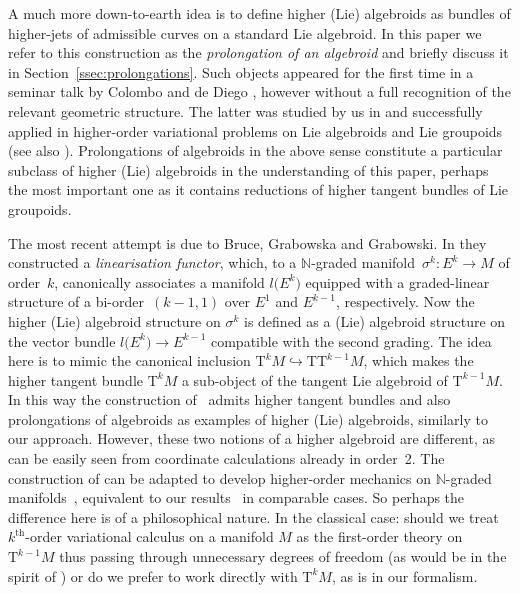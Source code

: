\documentclass[10pt,a4paper]{amsart}
\newcommand{\grB}{{$\N$-graded manifold}}
\newcommand{\grBs}{{$\N$-graded manifolds}}
\newcommand{\degree}{{order}}
\newcommand{\thh}[1]{#1^{\mathrm{th}}} %
\newcommand{\N}{\mathbb{N}}
\newcommand{\ra}{\rightarrow}
\newcommand{\T}{\mathrm{T}} %
\newcommand{\TT}[1]{\mathrm{T}^{#1}} %
\numberwithin{equation}{section}
\theoremstyle{definition}
\begin{document}
A much more down-to-earth idea is to define higher (Lie) algebroids as bundles of higher-jets of admissible curves on a standard Lie algebroid. In this paper we refer to this construction as the \emph{prolongation of an algebroid} and briefly discuss it in Section~\ref{ssec:prolongations}. Such objects appeared for the first time in a seminar talk by Colombo and de Diego \cite{Col_deDiego_seminar_2011}, however without a full recognition of the relevant geometric structure. The latter was studied by us in \cite{MJ_MR_models_high_alg_2015} and successfully applied in higher-order variational problems on Lie algebroids and Lie groupoids \cite{MJ_MR_prototypes} (see also \cite{Martinez_2015}). Prolongations of algebroids in the above sense constitute a particular subclass of higher (Lie) algebroids in the understanding of this paper, perhaps the most important one as it contains reductions of higher tangent bundles of Lie groupoids.

The most recent attempt is due to Bruce, Grabowska and Grabowski. In \cite{Bruce_Grabowska_Grabowski_2016} they constructed a \emph{linearisation functor}, which, to a \grB\ $\sigma^k\colon E^k\ra M$ of \degree\ $k$, canonically associates a manifold $l\big(E^k\big)$ equipped with a graded-linear structure of a bi-\degree\ $(k-1,1)$ over $E^1$ and $E^{k-1}$, respectively. Now the higher (Lie) algebroid structure on $\sigma^k$ is defined as a (Lie) algebroid structure on the vector bundle $l\big(E^k\big)\ra E^{k-1}$ compatible with the second grading. The idea here is to mimic the canonical inclusion $\TT{k} M\hookrightarrow \T \TT{k-1} M$, which makes the higher tangent bundle $\TT{k}M$ a sub-object of the tangent Lie algebroid of $\TT{k-1}M$. In this way the construction of~\cite{Bruce_Grabowska_Grabowski_2016} admits higher tangent bundles and also prolongations of algebroids as examples of higher (Lie) algebroids, similarly to our approach. However, these two notions of a higher algebroid are different, as can be easily seen from coordinate calculations already in \degree\ 2. The construction of \cite{Bruce_Grabowska_Grabowski_2016} can be adapted to develop higher-order mechanics on \grBs\ \cite{BGG_2015}, equivalent to our results~\cite{MJ_MR_prototypes} in comparable cases. So perhaps the difference here is of a philosophical nature. In the classical case: should we treat $\thh{k}$-order variational calculus on a manifold $M$ as the first-order theory on~$\TT{k-1}M$ thus passing through unnecessary degrees of freedom (as would be in the spirit of \cite{Bruce_Grabowska_Grabowski_2016}) or do we prefer to work directly with $\TT{k} M$, as is in our formalism.
\end{document}
